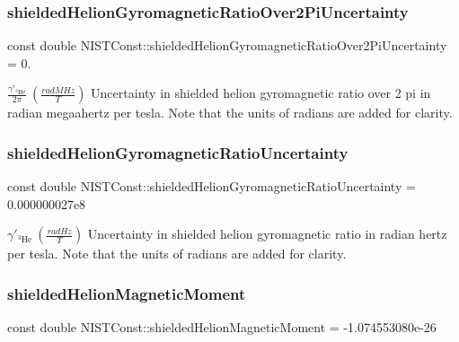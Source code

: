 \subsubsection{\texorpdfstring{shielded\+Helion\+Gyromagnetic\+Ratio\+Over2\+Pi\+Uncertainty}{shieldedHelionGyromagneticRatioOver2PiUncertainty}}
{\footnotesize\ttfamily const double N\+I\+S\+T\+Const\+::shielded\+Helion\+Gyromagnetic\+Ratio\+Over2\+Pi\+Uncertainty = 0.}

$\frac{\gamma'_{^3\textrm{He}}}{2 \pi} \ (\frac{rad MHz}{T})$ Uncertainty in shielded helion gyromagnetic ratio over 2 pi in radian megaahertz per tesla. Note that the units of radians are added for clarity. \mbox{\label{group___helion_ga2f3b1faa760be34cc23805484a9de01e}} 
\subsubsection{\texorpdfstring{shielded\+Helion\+Gyromagnetic\+Ratio\+Uncertainty}{shieldedHelionGyromagneticRatioUncertainty}}
{\footnotesize\ttfamily const double N\+I\+S\+T\+Const\+::shielded\+Helion\+Gyromagnetic\+Ratio\+Uncertainty = 0.\+000000027e8}

$\gamma'_{^3\textrm{He}} \ (\frac{rad Hz}{T})$ Uncertainty in shielded helion gyromagnetic ratio in radian hertz per tesla. Note that the units of radians are added for clarity. \mbox{\label{group___helion_ga1b0f92c14390afe726af4005e21c2ae8}} 
\subsubsection{\texorpdfstring{shielded\+Helion\+Magnetic\+Moment}{shieldedHelionMagneticMoment}}
{\footnotesize\ttfamily const double N\+I\+S\+T\+Const\+::shielded\+Helion\+Magnetic\+Moment = -\/1.\+074553080e-\/26}

